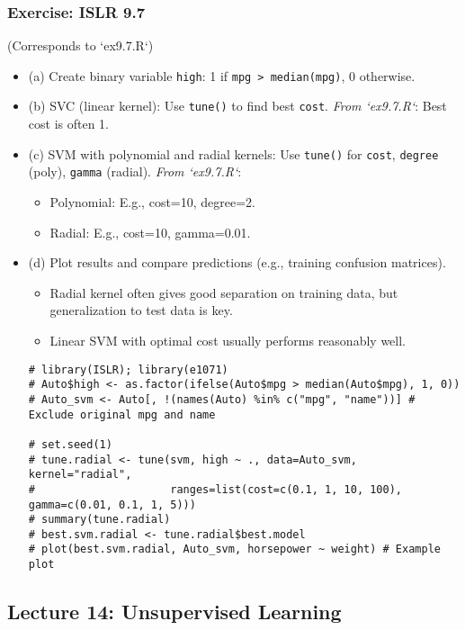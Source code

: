 \documentclass[12pt,a4paper]{article}
\newcommand{\Rfunction}[1]{\texttt{#1()}} %
\newcommand{\Rcode}[1]{\texttt{#1}} %
\begin{document}
    \subsubsection{Exercise: ISLR 9.7 }
        (Corresponds to `ex9.7.R`)
        \begin{itemize}
            \item (a) Create binary variable \Rcode{high}: 1 if \Rcode{mpg > median(mpg)}, 0 otherwise.
            \item (b) SVC (linear kernel): Use \Rfunction{tune} to find best \Rcode{cost}.
                \textit{From `ex9.7.R`}: Best cost is often 1.
            \item (c) SVM with polynomial and radial kernels: Use \Rfunction{tune} for \Rcode{cost}, \Rcode{degree} (poly), \Rcode{gamma} (radial).
                \textit{From `ex9.7.R`}:
                \begin{itemize}
                    \item Polynomial: E.g., cost=10, degree=2.
                    \item Radial: E.g., cost=10, gamma=0.01.
                \end{itemize}
            \item (d) Plot results and compare predictions (e.g., training confusion matrices).
                \begin{itemize}
                    \item Radial kernel often gives good separation on training data, but generalization to test data is key.
                    \item Linear SVM with optimal cost usually performs reasonably well.
                \end{itemize}
\begin{lstlisting}[caption={ISLR 9.7 - Tuning SVM (Example for Radial)}]
# library(ISLR); library(e1071)
# Auto$high <- as.factor(ifelse(Auto$mpg > median(Auto$mpg), 1, 0))
# Auto_svm <- Auto[, !(names(Auto) %in% c("mpg", "name"))] # Exclude original mpg and name

# set.seed(1)
# tune.radial <- tune(svm, high ~ ., data=Auto_svm, kernel="radial",
#                     ranges=list(cost=c(0.1, 1, 10, 100), gamma=c(0.01, 0.1, 1, 5)))
# summary(tune.radial)
# best.svm.radial <- tune.radial$best.model
# plot(best.svm.radial, Auto_svm, horsepower ~ weight) # Example plot
\end{lstlisting}
        \end{itemize}

\subsection{Lecture 14: Unsupervised Learning }
\end{document}
